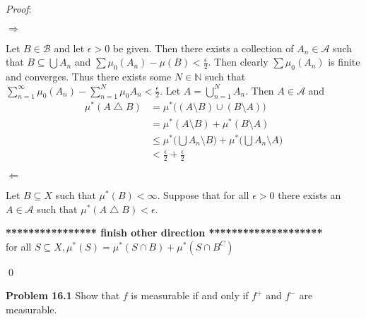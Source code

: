 \documentclass[12pt]{article}
\newcommand{\problem}[1]{\hspace{-4 ex} \large \textbf{Problem #1} }
\renewenvironment{proof}{\hspace{-4 ex} \emph{Proof}:}{\qed}
\newcommand{\NN}{\mathbb{N}}
\newcommand{\BB}{\mathcal{B}}
\newcommand{\SA}{\mathcal{A}}
\begin{document}
\begin{proof}
	
	$\Longrightarrow$
	
	Let $B \in \BB$ and let $\epsilon > 0$ be given. Then there exists a collection of $A_n \in \SA$ such that $B \subseteq \bigcup A_n$ and $\sum \mu_0(A_n) - \mu(B) < \tfrac{\epsilon}{2}$. Then clearly $\sum \mu_0(A_n)$ is finite and converges. Thus there exists some $N \in \NN$ such that $\sum\limits_{n=1}^\infty \mu_0(A_n) - \sum\limits_{n=1}^N \mu_0{A_n} < \tfrac{\epsilon}{2}$. Let $A = \bigcup\limits_{n=1}^N A_n$. Then $A \in \SA$ and 
	\begin{align*}
		\mu^*(A \bigtriangleup B) 
		& = \mu^* \big( (A \setminus B) \cup (B \setminus A) \big ) \\
		& = \mu^*(A \setminus B) + \mu^*(B \setminus A) \\
		& \leq  \mu^* \Big( \bigcup A_n \setminus B \Big ) + \mu^* \Big( \bigcup A_n \setminus A \Big ) \\
		& < \tfrac{\epsilon}{2} + \tfrac{\epsilon}{2}
	\end{align*}
	
	$\Longleftarrow$
	
	Let $B \subseteq X$ such that $\mu^*(B) < \infty$. Suppose that for all $\epsilon > 0$ there exists an $A \in \SA$ such that $\mu^*(A \bigtriangleup B) < \epsilon$. 
	
	\bigbreak \textbf{**************** finish other direction ********************} \\
	for all $S \subseteq X, \mu^*(S) = \mu^*(S \cap B) + \mu^*(S \cap B^C)$
	
\end{proof}


\bigbreak
\problem{16.1} Show that $f$ is measurable if and only if $f^+$ and $f^-$ are measurable.
\bigbreak
\end{document}

